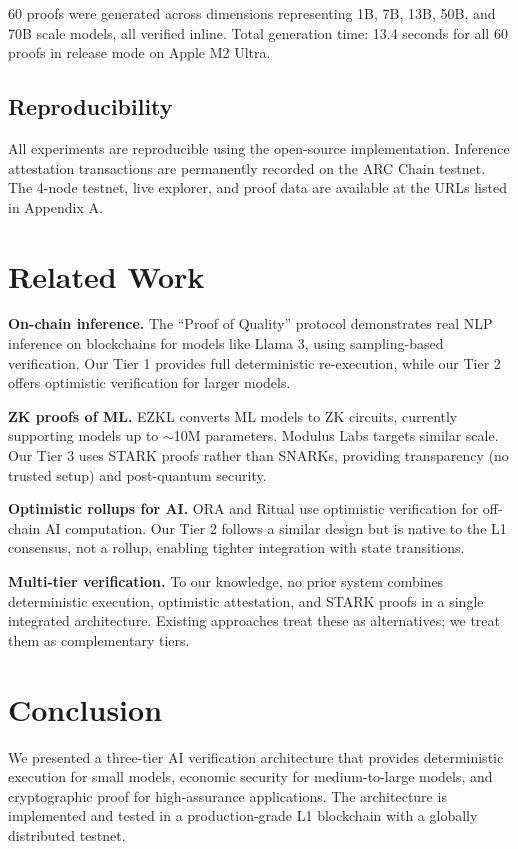 \documentclass[conference]{IEEEtran}
\begin{document}
60 proofs were generated across dimensions representing 1B, 7B, 13B, 50B, and 70B scale models, all verified inline. Total generation time: 13.4 seconds for all 60 proofs in release mode on Apple M2 Ultra.

\subsection{Reproducibility}

All experiments are reproducible using the open-source implementation. Inference attestation transactions are permanently recorded on the ARC Chain testnet. The 4-node testnet, live explorer, and proof data are available at the URLs listed in Appendix A.

\section{Related Work}

\textbf{On-chain inference.} The ``Proof of Quality'' protocol \cite{pqml} demonstrates real NLP inference on blockchains for models like Llama 3, using sampling-based verification. Our Tier 1 provides full deterministic re-execution, while our Tier 2 offers optimistic verification for larger models.

\textbf{ZK proofs of ML.} EZKL \cite{ezkl} converts ML models to ZK circuits, currently supporting models up to $\sim$10M parameters. Modulus Labs \cite{modulus} targets similar scale. Our Tier 3 uses STARK proofs rather than SNARKs, providing transparency (no trusted setup) and post-quantum security.

\textbf{Optimistic rollups for AI.} ORA \cite{ora} and Ritual \cite{ritual} use optimistic verification for off-chain AI computation. Our Tier 2 follows a similar design but is native to the L1 consensus, not a rollup, enabling tighter integration with state transitions.

\textbf{Multi-tier verification.} To our knowledge, no prior system combines deterministic execution, optimistic attestation, and STARK proofs in a single integrated architecture. Existing approaches treat these as alternatives; we treat them as complementary tiers.

\section{Conclusion}

We presented a three-tier AI verification architecture that provides deterministic execution for small models, economic security for medium-to-large models, and cryptographic proof for high-assurance applications. The architecture is implemented and tested in a production-grade L1 blockchain with a globally distributed testnet.
\end{document}
